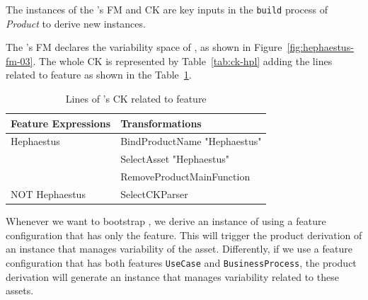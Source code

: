 The instances of the \hpl{}'s FM and CK are key inputs in the \texttt{build} process of \textit{\hp{} Product} to derive new \hpl{} instances.


The \hpl{}'s FM declares the variability space of \hpl{}, as shown in Figure~\ref{fig:hephaestus-fm-03}.
The whole  CK is represented by Table~\ref{tab:ck-hpl} adding the lines related to \texttt{\hp{}} feature as shown in the Table~\ref{tab:ck-hpl-2}.

\begin{table}[h]
\begin{center}
\begin{tabular}{||l||l||}
  \hline
  \textbf{Feature Expressions} & \textbf{Transformations}   \\  \hline
  Hephaestus & BindProductName "Hephaestus" \\
             &  SelectAsset "Hephaestus"   \\
             &  RemoveProductMainFunction \\ \hline
  NOT Hephaestus & SelectCKParser \\ \hline
\end{tabular}
\caption{Lines of \hpl's CK related to \texttt{\hp{}} feature}
\label{tab:ck-hpl-2}
\end{center}
\end{table}

Whenever we want to bootstrap \hpl, we derive an instance of \hpl{}
using a feature configuration that has only the \texttt{\hp{}} feature. This will
trigger the product derivation of an instance that manages variability
of the \hp{} asset. Differently, if we use a feature configuration
that has both features \texttt{UseCase} and \texttt{BusinessProcess}, 
the product derivation will generate an
\hpl{} instance that manages variability related to these assets.   





